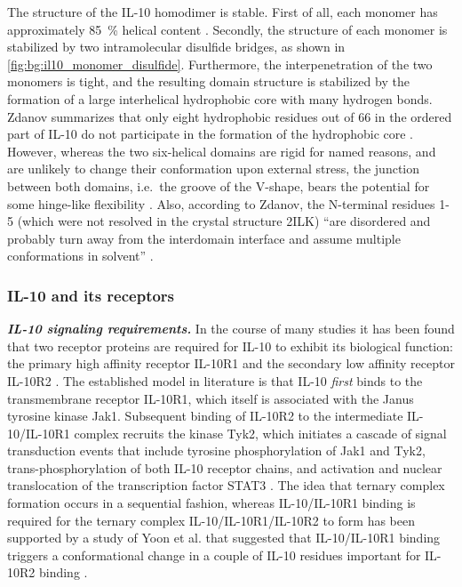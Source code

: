 The structure of the IL-10 homodimer is stable. First of all, each monomer has
approximately \SI{85}{\percent} helical content \cite{Zdanov1995}. Secondly, the
structure of each monomer is stabilized by two intramolecular disulfide bridges,
as shown in \cref{fig:bg:il10_monomer_disulfide}. Furthermore, the
interpenetration of the two monomers is tight, and the resulting domain
structure is stabilized by the formation of a large interhelical hydrophobic
core with many hydrogen bonds. Zdanov summarizes that only eight hydrophobic
residues out of 66 in the ordered part of IL-10 do not participate in the
formation of the hydrophobic core \cite{Zdanov1995}. However, whereas the two
six-helical domains are rigid for named reasons, and are unlikely to change
their conformation upon external stress, the junction between both domains,
i.e.\ the groove of the V-shape, bears the potential for some hinge-like
flexibility \cite{Zdanov1995}. Also, according to Zdanov, the N-terminal
residues 1-5 (which were not resolved in the crystal structure 2ILK)
\enquote{are disordered and probably turn away from the interdomain interface
and assume multiple conformations in solvent} \cite{Zdanov1996}.


\subsubsection{IL-10 and its receptors}


\vspace{0.5cm}
\textit{\textbf{IL-10 signaling requirements.}}
In the course of many studies it has been found that two receptor proteins are
required for IL-10 to exhibit its biological function: the primary high affinity
receptor IL-10R1 and the secondary low affinity receptor IL-10R2
\cite{mosser_il10_newperspectives_2008}. The established model in literature is
that IL-10 \textit{first} binds to the transmembrane receptor IL-10R1, which
itself is associated with the Janus tyrosine kinase Jak1. Subsequent binding of
IL-10R2 to the intermediate IL-10/IL-10R1 complex recruits the kinase Tyk2,
which initiates a cascade of signal transduction events that include tyrosine
phosphorylation of Jak1 and Tyk2, trans-phosphorylation of both IL-10 receptor
chains, and activation and nuclear translocation of the transcription factor
STAT3
\cite{donnelly_finbloom_il10_1999}. The idea that ternary complex formation
occurs in a sequential fashion, whereas IL-10/IL-10R1 binding is required for
the ternary complex IL-10/IL-10R1/IL-10R2 to form has been supported by a study
of Yoon et al. that suggested that IL-10/IL-10R1 binding triggers a
conformational change in a couple of IL-10 residues important for IL-10R2
binding \cite{il10r2_conf_changes_2006}.

